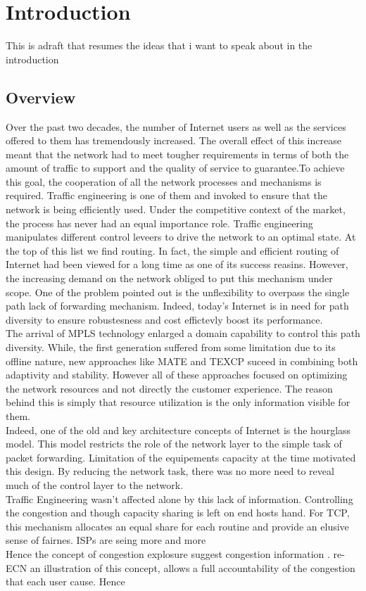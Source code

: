 \chapter{Introduction}
\label{chapter:intro}

This is adraft that resumes the ideas that i want to speak about in the introduction
\section{Overview}     %

Over the past two decades, the number of Internet users as well as the services offered to them has tremendously increased. The overall effect of this increase meant that the network had to meet tougher requirements in terms of both the amount of traffic to support and the quality of service to guarantee.To achieve this goal, the cooperation of all the network processes and mechanisms is required. Traffic engineering is one of them and invoked to ensure that the network is being efficiently used. Under the competitive context of the market, the process has never had an equal importance role. Traffic engineering manipulates different control leveers to drive the network to an optimal state. At the top of this list we find routing. In fact, the simple and efficient routing of Internet had been viewed for a long time as one of its success reasins. However, the increasing demand on the network obliged to put this mechanism under scope. One of the problem pointed out is the unflexibility to overpass the single path lack of forwarding mechanism. Indeed, today's Internet is in need for path diversity to ensure robustesness and cost effictevly boost its performance. 
\\ The arrival of MPLS technology enlarged a domain capability to control this path diversity. While, the first generation suffered from some limitation due to its offline nature, new approaches like MATE and TEXCP suceed in combining both adaptivity and stability. However all of these approaches focused on optimizing the network resources and not directly the customer experience. The reason behind this is simply that resource utilization is the only information visible for them. 
\\ Indeed, one of the old and key architecture concepts of Internet is the hourglass model. This model restricts the role of the network layer to the simple task of packet forwarding. Limitation of the equipements capacity at the time motivated this design. By reducing the network task, there was no more need to reveal much of the control layer to the network.
\\ Traffic Engineering wasn't affected alone by this lack of information. Controlling the congestion and though capacity sharing is left on end hosts hand. For TCP, this mechanism allocates an equal share for each routine and provide an elusive sense of fairnes. ISPs are seing more and more 
\\ Hence the concept of congestion explosure suggest congestion information . re-ECN an illustration of this concept, allows a full accountability of the congestion that each user cause. Hence

